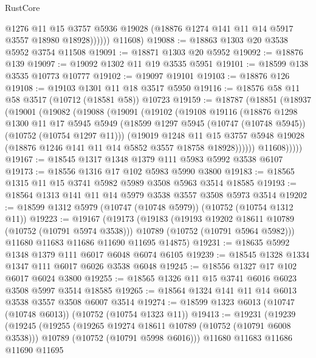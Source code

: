 \begin{lexlean}{RustCore}
\begin{coremodule}
                @1276
                @11
                @15
                @3757
                @5936
                @19028
                (@18876 @1274 @141 @11 @14 @5917 @3557 @18980 @18928))))))
      @11608)
@19088 := @18863 @1303 @20 @3538 @5952 @3754 @11508
@19091 := @18871 @1303 @20 @5952
@19092 := @18876 @139
@19097 := @19092 @1302 @11 @19 @3535 @5951
@19101 := @18599 @138 @3535 @10773 @10777
@19102 := @19097 @19101
@19103 := @18876 @126
@19108 := @19103 @1301 @11 @18 @3517 @5950
@19116 := @18576 @58 @11 @58 @3517 (@10712 (@18581 @58)) @10723
@19159 := @18787
    (@18851
      (@18937
        (@19001
          (@19082
            (@19088
              (@19091
                (@19102
                  (@19108
                    @19116
                    (@18876
                      @1298
                      @1300
                      @11
                      @17
                      @5945
                      @5949
                      (@18599 @1297 @5945 (@10747 (@10748 @5945)) (@10752 (@10754 @1297 @11)))
                      (@19019
                        @1248
                        @11
                        @15
                        @3757
                        @5948
                        @19028
                        (@18876 @1246 @141 @11 @14 @5852 @3557 @18758 @18928))))))
              @11608)))))
@19167 := @18545 @1317 @1348 @1379 @111 @5983 @5992 @3538 @6107
@19173 := @18556 @1316 @17 @102 @5983 @5990 @3800
@19183 := @18565 @1315 @11 @15 @3741 @5982 @5989 @3508 @5963 @3514 @18585
@19193 := @18564 @1313 @141 @11 @14 @5979 @3538 @3557 @3508 @5973 @3514
@19202 := @18599 @1312 @5979 (@10747 (@10748 @5979)) (@10752 (@10754 @1312 @11))
@19223 := @19167
    (@19173
      (@19183
        (@19193 @19202 @18611 @10789 (@10752 (@10791 @5974 @3538)))
        @10789
        (@10752 (@10791 @5964 @5982)))
      @11680
      @11683
      @11686
      @11690
      @11695
      @14875)
@19231 := @18635 @5992 @1348 @1379 @111 @6017 @6048 @6074 @6105
@19239 := @18545 @1328 @1334 @1347 @111 @6017 @6026 @3538 @6048
@19245 := @18556 @1327 @17 @102 @6017 @6024 @3800
@19255 := @18565 @1326 @11 @15 @3741 @6016 @6023 @3508 @5997 @3514 @18585
@19265 := @18564 @1324 @141 @11 @14 @6013 @3538 @3557 @3508 @6007 @3514
@19274 := @18599 @1323 @6013 (@10747 (@10748 @6013)) (@10752 (@10754 @1323 @11))
@19413 := @19231
    (@19239
      (@19245
        (@19255
          (@19265 @19274 @18611 @10789 (@10752 (@10791 @6008 @3538)))
          @10789
          (@10752 (@10791 @5998 @6016)))
        @11680
        @11683
        @11686
        @11690
        @11695

\end{coremodule}
\end{lexlean}
